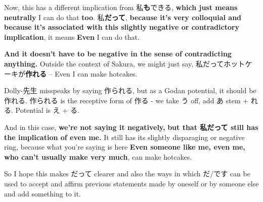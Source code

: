 {}

Now, this has a different implication from 私{\bf も}できる, {\bf which just means neutrally} I can do that {\bf too}. 私{\bf だって}, {\bf because it's very colloquial and because it's associated with this slightly} {\bf negative or contradictory implication}, it means {\bf Even} I can do that.

\thinrule

{\bf And it doesn't have to be negative in the sense of contradicting anything.} Outside the context of Sakura, we might just say, 私だってホットケーキが{\bf 作れる} -- Even I can make hotcakes.

Dolly-先生 misspeaks by saying 作られる, but as a Godan potential, it should be 作れる. 作られる is the receptive form of 作る - we take う off, add あ stem + れる. Potential is え + る.

{}

And in this case, {\bf we're not saying it negatively,} {\bf but that 私だって still has the implication of even me.} It still has its slightly disparaging or negative ring, because what you're saying is here {\bf Even someone like me, even me, who can't usually make very much}, can make hotcakes.

So I hope this makes だって clearer and also the ways in which だ/です can be used to accept and affirm previous statements made by oneself or by someone else and add something to it.

\stopsectionlevel

\stopsectionlevel
